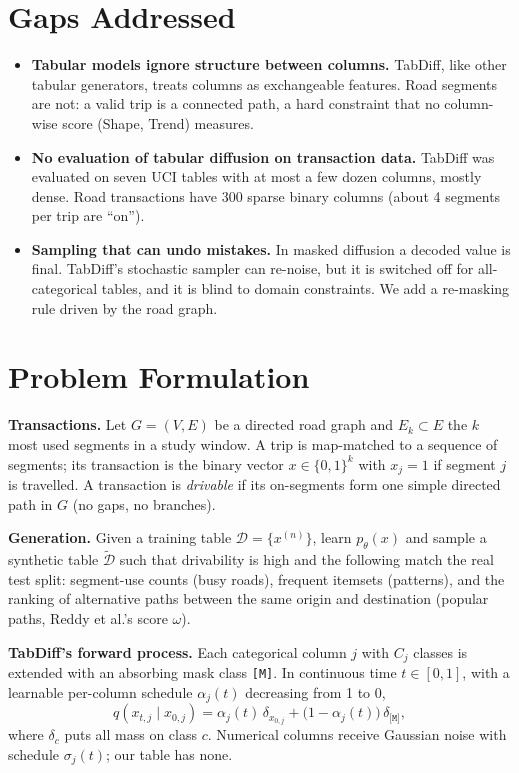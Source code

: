 \documentclass[10pt,twocolumn,a4paper]{article}
\newcommand{\M}{\texttt{[M]}}
\begin{document}
\section{Gaps Addressed}
\label{sec:b}
\begin{itemize}\setlength\itemsep{1pt}
\item \textbf{Tabular models ignore structure between columns.} TabDiff, like other tabular generators,
  treats columns as exchangeable features. Road segments are not: a valid trip is a connected path, a
  hard constraint that no column-wise score (Shape, Trend) measures.
\item \textbf{No evaluation of tabular diffusion on transaction data.} TabDiff was evaluated on seven UCI
  tables with at most a few dozen columns, mostly dense. Road transactions have 300 sparse binary columns
  (about 4 segments per trip are ``on'').
\item \textbf{Sampling that can undo mistakes.} In masked diffusion a decoded value is final. TabDiff's
  stochastic sampler can re-noise, but it is switched off for all-categorical tables, and it is blind to
  domain constraints. We add a re-masking rule driven by the road graph.
\end{itemize}

\section{Problem Formulation}
\label{sec:c}
\textbf{Transactions.} Let $G=(V,E)$ be a directed road graph and $E_k\subset E$ the $k$ most used
segments in a study window. A trip is map-matched to a sequence of segments; its transaction is the
binary vector $x\in\{0,1\}^{k}$ with $x_j=1$ if segment $j$ is travelled. A transaction is
\emph{drivable} if its on-segments form one simple directed path in $G$ (no gaps, no branches).

\textbf{Generation.} Given a training table $\mathcal{D}=\{x^{(n)}\}$, learn $p_\theta(x)$ and sample a
synthetic table $\tilde{\mathcal{D}}$ such that drivability is high and the following match the real test
split: segment-use counts (busy roads), frequent itemsets (patterns), and the ranking of alternative
paths between the same origin and destination (popular paths, Reddy et al.'s score $\omega$).

\textbf{TabDiff's forward process.} Each categorical column $j$ with $C_j$ classes is extended with an
absorbing mask class \M. In continuous time $t\in[0,1]$, with a learnable per-column schedule
$\alpha_j(t)$ decreasing from 1 to 0,
\begin{equation}
q(x_{t,j}\mid x_{0,j}) = \alpha_j(t)\,\delta_{x_{0,j}} + \big(1-\alpha_j(t)\big)\,\delta_{\M},
\end{equation}
where $\delta_c$ puts all mass on class $c$. Numerical columns receive Gaussian noise with schedule $\sigma_j(t)$; our table has none.
\end{document}
